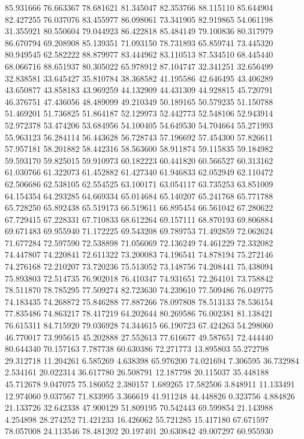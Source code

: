85.931666
76.663367
78.681621
81.345047
82.353766
88.115110
85.644904
82.427255
76.037076
83.455977
86.098061
73.341905
82.919865
54.061198
31.355921
80.550604
79.044923
86.422818
85.484149
79.100836
80.317979
86.670794
69.208908
85.139351
71.093150
78.731893
65.859741
73.445320
80.949545
62.582222
88.879977
83.444962
83.110513
87.534510
68.445440
68.066716
88.651937
80.305022
65.978912
87.104747
32.341251
32.656499
32.838581
33.645427
35.810784
38.368582
41.195586
42.646495
43.406289
43.650877
43.858183
43.969259
44.132909
44.431309
44.928815
45.720791
46.376751
47.436056
48.489099
49.210349
50.189165
50.579235
51.150788
51.469201
51.736825
51.864187
52.129973
52.442773
52.548106
52.943914
52.972378
53.474206
53.684956
54.100405
54.649530
54.704664
55.271993
55.963123
56.284114
56.443628
56.728743
57.196692
57.454300
57.826611
57.957181
58.201882
58.442316
58.563600
58.911874
59.115835
59.184982
59.593170
59.825015
59.910973
60.182223
60.441820
60.566527
60.313162
61.030766
61.322073
61.452882
61.427340
61.946833
62.052949
62.110472
62.506686
62.538105
62.554525
63.100171
63.054117
63.735253
63.851009
64.154354
64.293285
64.669334
65.014684
65.140207
65.241768
65.771788
65.728250
65.892438
65.519173
66.519611
66.895454
66.561042
67.280622
67.729415
67.228331
67.710833
68.612264
69.157111
68.870193
69.806884
69.671483
69.955940
71.172225
69.543208
69.789753
71.492859
72.062624
71.677284
72.597590
72.538898
71.056069
72.136249
74.461229
72.332082
74.447807
74.220841
72.611322
73.200083
74.196541
74.878194
75.272146
74.276168
72.210207
73.720236
75.513052
73.148756
74.208441
75.438094
75.893803
72.514735
76.902018
76.410347
74.931651
72.264101
73.758842
78.511870
78.785295
77.509274
82.723630
74.239610
77.509486
76.049775
74.183435
74.268872
75.846288
77.887266
78.097808
78.513133
78.536154
77.835486
74.863217
78.417219
64.202644
80.269586
76.002381
81.138421
76.615311
84.715920
79.036928
74.344615
66.190723
67.424263
54.298060
46.770017
73.995615
45.202888
27.552613
77.616677
49.587651
72.444440
80.644340
70.157163
7.787738
60.630386
72.271773
13.895803
55.272798
29.312718
11.204261
6.585269
4.638398
65.976200
74.021694
7.306595
36.732984
2.534161
20.022314
36.617780
26.508791
12.187798
20.115037
35.448188
45.712678
9.047075
75.186052
2.380157
1.689265
17.582506
3.848911
11.133491
12.974060
9.037567
71.833995
3.366619
41.911248
44.448826
0.323756
4.884826
21.133726
32.642338
47.900129
51.809195
70.542443
69.599854
21.143988
4.254898
28.274252
71.421233
16.426062
55.721285
15.417180
67.671597
78.057008
24.113546
78.481202
20.197401
20.630842
49.007297
60.955930
